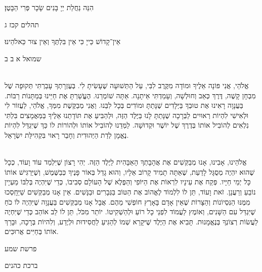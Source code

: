 \documentclass[14pt, article, extrafontsizes, twopage, a4paper]{memoir}
\newcommand{\attr}[1]{
{\raggedright\smaller#1}
}
\begin{document}
הִנֵּה נַחֲלַת יְיָ בָּנִים שָׂכָר פְּרִי הַבָּטֶן׃
\attr{תהלים קכז ג}

אֵין־קָדוֹשׁ כַּייָ כִּי אֵין בִּלְתֶּךָ וְאֵין צוּר כֵּאלֹהֵינוּ׃
\attr{שמואל א ב ב}

\\
אֱלֹהַי,
אֲנִי פּוֹנָה אֵלֶיךָ וּמוֹדָה מִקֶּרֶב לִבִּי,
עַל הַתְּשׁוּעָה שֶׁעָשִׂיתָ לִי.
בְּעֶזְרָתְךָ עָבַרְתִּי תְּקוּפָה שֶׁל מִבְחָן קָשֶׁה,
דֶּרֶךְ כְּאֵב וְחוּלְשָׁה, וְעָמַדְתִּי אֵיתָנָה.
אַתָּה שׁוֹמְרֵנוּ.
הֶעֱשַׁרְתָּ אֶת חַיֵּינוּ בְּמַתָּנוֹת רַבּוֹת.
בַּעֲנָוָה רָאִינוּ אֶת טוּבְךָ בַּיְּלָדִים שֶׁנָּתַתָּ
וּמוֹדִים בְּכָל לִבֵּנוּ.
וַאֲנִי מְבַקֶּשֶׁת מִמְּךָ, אֱלֹהַי,
לַעֲזוֹר לִי וּלְאִישִׁי
לִהְיוֹת רְאוּיִים לַבְּרָכָה
שֶׁנָּתַתָּ לָנוּ בַּיֶּלֶד הַזֶּה,
וּלְהַבִּיעַ אֶת תּוֹדָתֵנוּ אֵלֶיךָ
בַּמַּאֲמָצִים בִּלְתִּי נִלְאִים לְהוֹבִיל אוֹתוֹ
בְּדֶרֶךְ שֶׁל יוֹשֶׁר וּקְדוּשָׁה.
לַמְּדֵנוּ לְהוֹבִיל אוֹתוֹ וּלְהוֹרוֹת לוֹ
כַּךְ שֶׁיִּגְדַּל לִהְיוֹת נֶאֱמָן לְדַת הַיְּהוּדִית 
וְחָבֵר רָאוּי בִּקְהִילַּת יִשְׂרָאֵל.

\\
אֱלֹהֵינוּ, אָבִינוּ,
אָנוּ מְבַקְּשִׁים אֶת אֲהָבָתְךָ הָאַבָּהִית לַיֶּלֶד הַזֶּה.
יְהִי רָצוֹן שֶׁיִּלְמַד עוֹד וָעוֹד,
כְכָל שֶׁהוּא יִהְיֶה מְסֻגָּל לָדַעַת,
שֶׁאַתָּה תָמִיד קָרוֹב אֵלָיו,
וְהוּא גָדֵל בְּאוֹר פָּנֶיךָ כְּבַשֶּׁמֶשׁ,
וְשֶׁיַּרְגִּישׁ אוֹתוֹ כָּל יְמֵי חַיָּיו.
פְּקַח אֶת עֵינָיו לִרְאוֹת אֶת הַיּוֹפִי וְהַפֶּלֶא שֶׁל הָעוֹלָם סְבִיבוֹ,
כְּדֵי שֶׁיִּהְיֶה בְּלִבּוֹ מַעְיָין נוֹבֵעַ וְרַעֲנָן.
זֹאת וָעוֹד,
תֵּן לוֹ לִלְמוֹד לֶאֱהוֹב אֶת הַטּוֹב בַּגְּבָרִים וּבַנָּשִׁים.
אֵין אָנוּ מְבַקְּשִׁים שֵׁיֵּחָֽסְכוּ מִמֶּנּוּ הַנִּסְיוֹנוֹת וְהַצָּרוֹת
שֶׁאֵין אָדָם בָּאָרֶץ חוֹפְשִׁי מֵהֶם.
אֲבָל אָנוּ מְבַקְּשִׁים בַּעֲנָוָה שֶׁיִּהְיֶה לוֹ כֹחַ שֶׁיִּגְדַּל עִם הַשָּׁנִים,
וְאוֹמֶץ לַעֲמוֹד לִפְנֵי כָל רוֹעַ וּלְהַשְׁקִיטוֹ.
יוֹתֵר מִכֹּל, תֵּן לוֹ לֵב אוֹהֵב כְּדֵי שֶׁיִּחְיֶה לַעֲשׂוֹת רְצוֹנְךָ בְּנֶאֱמָנוּת.
תָּבִיא אֶת הַיֶּלֶד שֶׁיּקָרֵא שְׁמוֹ 
לְהַגִּיעַ לַחֲסִידוּת וּלְיֶדַע,
וְלִהיוֹת בְּרָכָה,
וּבָרֵךְ אוֹתוֹ בְּחַיִּים אֲרוּכִּים.

{\centering\larger[2]
  פרשת שמע
  
 ברכת כהנים

}
\end{document}
